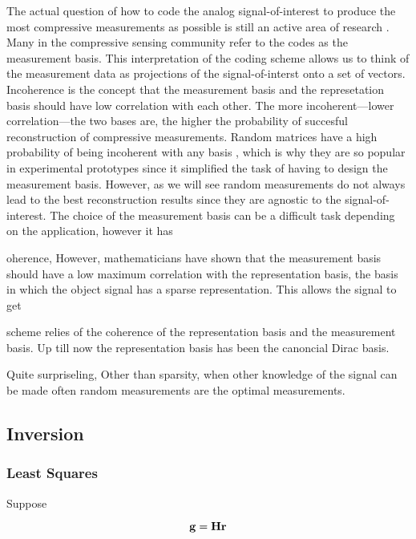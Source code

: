 The actual question of how to code the analog signal-of-interest to produce the most compressive measurements as possible is still an active area of research \cite{}. Many in the compressive sensing community refer to the codes as the measurement basis. This interpretation of the coding scheme allows us to think of the measurement data as projections of the signal-of-interst onto a set of vectors. Incoherence is the concept that the measurement basis and the represetation basis should have low correlation with each other. The more incoherent---lower correlation---the two bases are, the higher the probability of succesful reconstruction of compressive measurements. Random matrices have a high probability of being incoherent with any basis \cite{candes2008introduction}, which is why they are so popular in experimental prototypes \cite{} since it simplified the task of having to design the measurement basis. However, as we will see random measurements do not always lead to the best reconstruction results since they are agnostic to the signal-of-interest. The choice of the measurement basis can be a difficult task depending on the application, however it has 

oherence,  However, mathematicians have shown that the measurement basis should have a low maximum correlation with the representation basis, the basis in which the object signal has a sparse representation. This allows the signal to get 


scheme relies of the coherence of the representation basis and the measurement basis. Up till now the representation basis has been the canoncial Dirac basis. 

Quite surpriseling, Other than sparsity, when other knowledge of the signal can be made often random measurements are the optimal measurements. 



\subsection{Inversion}

\subsubsection{Least Squares}

Suppose 

\begin{equation}\label{eq:lineareq1}
	\mathbf{g} = \mathbf{Hr} 
\end{equation}


